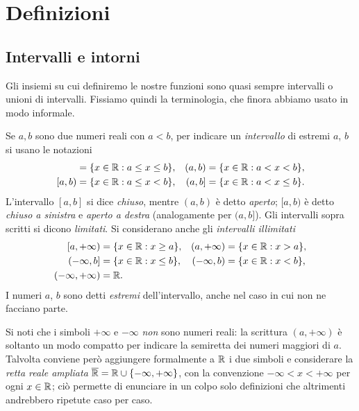 \section{Definizioni}
\label{sec:def-limite-funzioni}

\subsection{Intervalli e intorni}

Gli insiemi su cui definiremo le nostre funzioni sono quasi sempre intervalli o unioni
di intervalli. Fissiamo quindi la terminologia, che finora abbiamo usato in modo
informale.

\begin{definizione}[Intervalli]\label{def:intervalli}
Se $a,b$ sono due numeri reali con $a<b$, per indicare un \emph{intervallo} di estremi
$a$, $b$ si usano le notazioni
\begin{align}
  [a,b]&=\{x\in\R : a\le x\le b\}, & (a,b)&=\{x\in\R : a<x<b\}, \label{eq:intervalli-1}\\
  [a,b)&=\{x\in\R : a\le x<b\}, & (a,b]&=\{x\in\R : a<x\le b\}. \label{eq:intervalli-2}
\end{align}
L'intervallo $[a,b]$ si dice \emph{chiuso}, mentre $(a,b)$ è detto \emph{aperto};
$[a,b)$ è detto \emph{chiuso a sinistra} e \emph{aperto a destra} (analogamente per
$(a,b]$). Gli intervalli sopra scritti si dicono \emph{limitati}. Si considerano anche
gli \emph{intervalli illimitati}
\begin{equation}\label{eq:intervalli-illimitati}
\begin{aligned}
  [a,+\infty)&=\{x\in\R : x\ge a\}, & (a,+\infty)&=\{x\in\R : x>a\},\\
  (-\infty,b]&=\{x\in\R : x\le b\}, & (-\infty,b)&=\{x\in\R : x<b\},\\
  (-\infty,+\infty)&=\R .
\end{aligned}
\end{equation}
I numeri $a$, $b$ sono detti \emph{estremi} dell'intervallo, anche nel caso in cui non
ne facciano parte.
\end{definizione}

Si noti che i simboli $+\infty$ e $-\infty$ \emph{non} sono numeri reali: la scrittura
$(a,+\infty)$ è soltanto un modo compatto per indicare la semiretta dei numeri maggiori
di $a$. Talvolta conviene però aggiungere formalmente a $\mathbb{R}$ i due simboli e considerare
la \emph{retta reale ampliata} $\overline{\mathbb{R}}=\mathbb{R}\cup\{-\infty,+\infty\}$, con la
convenzione $-\infty<x<+\infty$ per ogni $x\in\mathbb{R}$; ciò permette di enunciare in un colpo
solo definizioni che altrimenti andrebbero ripetute caso per caso.

